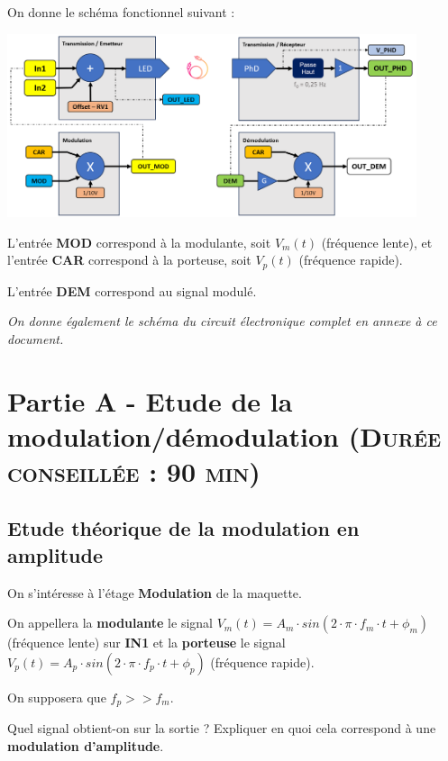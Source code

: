 \documentclass[a4paper,11pt]{article}
\begin{document}
On donne le schéma fonctionnel suivant :

	\begin{center}
		\includegraphics[width=0.9\textwidth]{images/AM_modulation.png}
	\end{center}


L'entrée \textbf{MOD} correspond à la modulante, soit $V_m(t)$ (fréquence lente), et l'entrée \textbf{CAR} correspond à la porteuse, soit $V_p(t)$ (fréquence rapide).

L'entrée \textbf{DEM} correspond au signal modulé.

\bigskip

\textit{On donne également le schéma du circuit électronique complet en annexe à ce document.}

	
\newpage
\section*{Partie A - Etude de la modulation/démodulation \textsc{\normalsize(Durée conseillée : 90 min)}}


\subsection*{Etude théorique de la modulation en amplitude}

On s'intéresse à l'étage \textbf{Modulation} de la maquette.

On appellera la \textbf{modulante}  le signal $V_m(t) = A_m \cdot sin(2 \cdot \pi \cdot f_m \cdot t + \phi_m)$ (fréquence lente) sur  \textsc{\textbf{IN1}} et la \textbf{porteuse}  le signal $V_p(t) = A_p \cdot sin(2 \cdot \pi \cdot f_p \cdot t + \phi_p)$ (fréquence rapide).

On supposera que $f_p >> f_m$.

\bigskip

\Real Quel signal obtient-on sur la sortie  ? Expliquer en quoi cela correspond à une \textbf{modulation d'amplitude}. 
\end{document}
